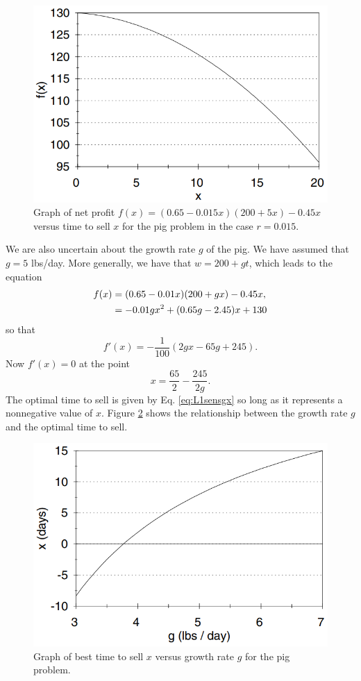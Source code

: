\begin{figure}[htbp]
\centering
\includegraphics[scale=0.4]{figs/PigExampFig4.png}
\caption{Graph of net profit $f(x)=(0.65-0.015x)(200+5x)-0.45x$ versus time to sell $x$ for the pig problem in the case $r=0.015$.}
\label{fig4:PigExamp}
\end{figure}

We are also uncertain about the growth rate $g$ of the pig. We have assumed that $g=5$ lbs/day. More generally, we have that $w=200+gt$, which leads to the equation
\begin{align}
\notag f(x)&=(0.65-0.01x)(200+gx)-0.45x,\\
\label{eq:L1sensgfx}&=-0.01gx^2+(0.65g-2.45)x+130
\end{align}
so that
$$
f'(x)=-\frac{1}{100}(2gx-65g+245).
$$
Now $f'(x)=0$ at the point
\begin{equation}\label{eq:L1sensgx}
x=\frac{65}{2}-\frac{245}{2g}.
\end{equation}
The optimal time to sell is given by Eq. \eqref{eq:L1sensgx} so long as it represents a nonnegative value of $x$. Figure \ref{fig5:PigExamp} shows the relationship between the growth rate $g$ and the optimal time to sell.

\begin{figure}[htbp]
\centering
\includegraphics[scale=0.4]{figs/PigExampFig5.png}
\caption{Graph of best time to sell $x$ versus growth rate $g$ for the pig problem.}
\label{fig5:PigExamp}
\end{figure}

